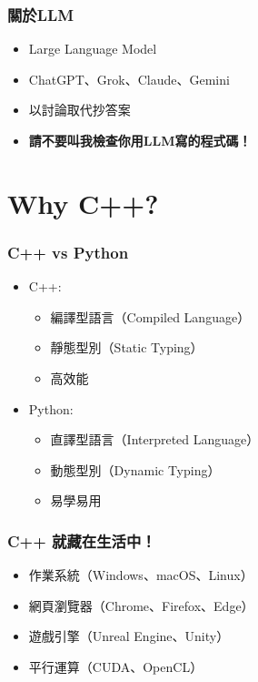 \documentclass[xcolor=dvipsnames]{beamer}
\begin{document}
    \begin{frame}
        \frametitle{關於LLM}
        \begin{itemize}
            \item Large Language Model
            \item ChatGPT、Grok、Claude、Gemini
            \item 以討論取代抄答案
            \item \textbf{請不要叫我檢查你用LLM寫的程式碼！}
        \end{itemize}
    \end{frame}

    \section{Why C++?}
    
    \begin{frame}
        \frametitle{C++ vs Python}
        \begin{itemize}
            \item C++:
            \begin{itemize}
                \item 編譯型語言（Compiled Language）
                \item 靜態型別（Static Typing）
                \item 高效能
            \end{itemize}
            \item Python:
            \begin{itemize}
                \item 直譯型語言（Interpreted Language）
                \item 動態型別（Dynamic Typing）
                \item 易學易用
            \end{itemize}
        \end{itemize}
    \end{frame}

    \begin{frame}
        \frametitle{C++ 就藏在生活中！}
        \begin{itemize}
            \item 作業系統（Windows、macOS、Linux）
            \item 網頁瀏覽器（Chrome、Firefox、Edge）
            \item 遊戲引擎（Unreal Engine、Unity）
            \item 平行運算（CUDA、OpenCL）
        \end{itemize}
    \end{frame}
    
\end{document}
